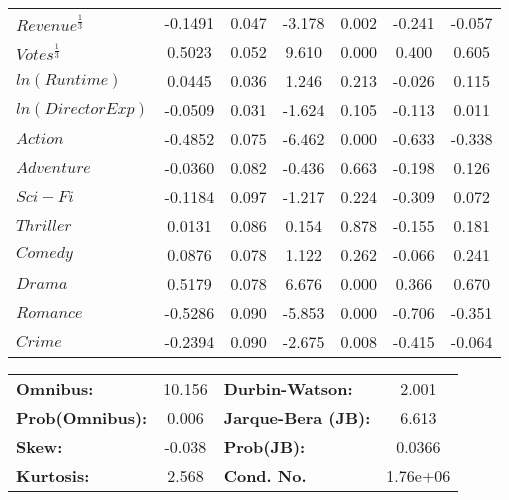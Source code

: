 \begin{center}
\begin{tabular}{lcccccc}
        \textbf{$Revenue^{\frac{1}{3}}$} &      -0.1491  &        0.047     &    -3.178  &         0.002        &       -0.241    &       -0.057     \\
        \textbf{$Votes^{\frac{1}{3}}$}   &       0.5023  &        0.052     &     9.610  &         0.000        &        0.400    &        0.605     \\
        \textbf{$ln(Runtime)$}           &       0.0445  &        0.036     &     1.246  &         0.213        &       -0.026    &        0.115     \\
        \textbf{$ln(Director Exp)$}      &      -0.0509  &        0.031     &    -1.624  &         0.105        &       -0.113    &        0.011     \\
        \textbf{$Action$}                &      -0.4852  &        0.075     &    -6.462  &         0.000        &       -0.633    &       -0.338     \\
        \textbf{$Adventure$}             &      -0.0360  &        0.082     &    -0.436  &         0.663        &       -0.198    &        0.126     \\
        \textbf{$Sci-Fi$}                &      -0.1184  &        0.097     &    -1.217  &         0.224        &       -0.309    &        0.072     \\
        \textbf{$Thriller$}              &       0.0131  &        0.086     &     0.154  &         0.878        &       -0.155    &        0.181     \\
        \textbf{$Comedy$}                &       0.0876  &        0.078     &     1.122  &         0.262        &       -0.066    &        0.241     \\
        \textbf{$Drama$}                 &       0.5179  &        0.078     &     6.676  &         0.000        &        0.366    &        0.670     \\
        \textbf{$Romance$}               &      -0.5286  &        0.090     &    -5.853  &         0.000        &       -0.706    &       -0.351     \\
        \textbf{$Crime$}                 &      -0.2394  &        0.090     &    -2.675  &         0.008        &       -0.415    &       -0.064     \\
        \bottomrule
        \end{tabular}
        \begin{tabular}{lclc}
        \textbf{Omnibus:}       & 10.156 & \textbf{  Durbin-Watson:     } &    2.001  \\
        \textbf{Prob(Omnibus):} &  0.006 & \textbf{  Jarque-Bera (JB):  } &    6.613  \\
        \textbf{Skew:}          & -0.038 & \textbf{  Prob(JB):          } &   0.0366  \\
        \textbf{Kurtosis:}      &  2.568 & \textbf{  Cond. No.          } & 1.76e+06  \\
        \bottomrule
        \end{tabular}
        \end{center}

